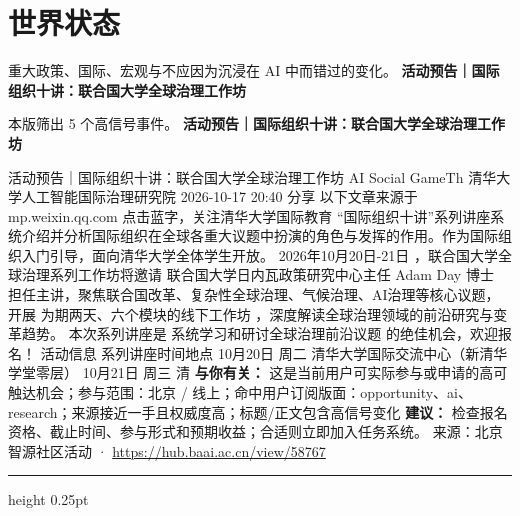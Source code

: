\documentclass[10.5pt]{ctexart}
\begin{document}
\section*{世界状态}
{\color{ormuted} 重大政策、国际、宏观与不应因为沉浸在 AI 中而错过的变化。}
\vspace{2mm}
{\LARGE\bfseries 活动预告｜国际组织十讲：联合国大学全球治理工作坊}\par
\vspace{1mm}
{\color{ormuted} 本版筛出 5 个高信号事件。}
\vspace{3mm}
{\Large\bfseries 活动预告｜国际组织十讲：联合国大学全球治理工作坊}\par
活动预告｜国际组织十讲：联合国大学全球治理工作坊 AI Social GameTh 清华大学人工智能国际治理研究院 2026-10-17 20:40 分享 以下文章来源于mp.weixin.qq.com 点击蓝字，关注清华大学国际教育 “国际组织十讲”系列讲座系统介绍并分析国际组织在全球各重大议题中扮演的角色与发挥的作用。作为国际组织入门引导，面向清华大学全体学生开放。 2026年10月20日-21日 ，联合国大学全球治理系列工作坊将邀请 联合国大学日内瓦政策研究中心主任 Adam Day 博士 担任主讲，聚焦联合国改革、复杂性全球治理、气候治理、AI治理等核心议题，开展 为期两天、六个模块的线下工作坊 ，深度解读全球治理领域的前沿研究与变革趋势。 本次系列讲座是 系统学习和研讨全球治理前沿议题 的绝佳机会，欢迎报名！ 活动信息 系列讲座时间地点 10月20日 周二 清华大学国际交流中心（新清华学堂零层） 10月21日 周三 清
\textbf{与你有关：} 这是当前用户可实际参与或申请的高可触达机会；参与范围：北京 / 线上；命中用户订阅版面：opportunity、ai、research；来源接近一手且权威度高；标题/正文包含高信号变化
\textbf{建议：} 检查报名资格、截止时间、参与形式和预期收益；合适则立即加入任务系统。
{\footnotesize\color{ormuted} 来源：北京智源社区活动 · \url{https://hub.baai.ac.cn/view/58767}}
\vspace{4mm}
\hrule height 0.25pt
\vspace{3mm}
\end{document}

